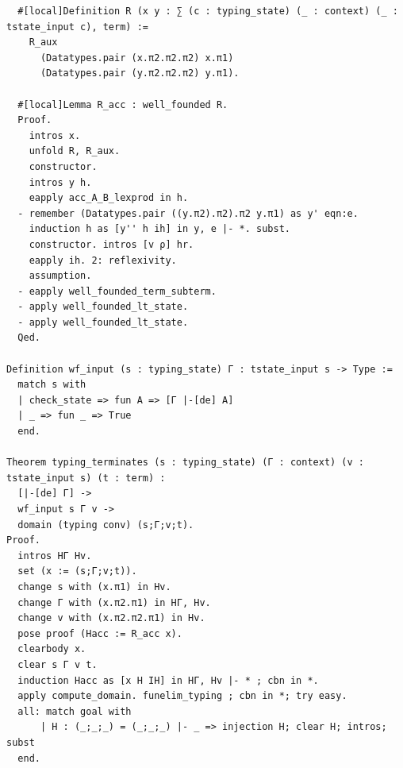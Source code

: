 \begin{lstlisting}
  #[local]Definition R (x y : ∑ (c : typing_state) (_ : context) (_ : tstate_input c), term) :=
    R_aux
      (Datatypes.pair (x.π2.π2.π2) x.π1)
      (Datatypes.pair (y.π2.π2.π2) y.π1).
  
  #[local]Lemma R_acc : well_founded R.
  Proof.
    intros x.
    unfold R, R_aux.
    constructor.
    intros y h.
    eapply acc_A_B_lexprod in h.
  - remember (Datatypes.pair ((y.π2).π2).π2 y.π1) as y' eqn:e.
    induction h as [y'' h ih] in y, e |- *. subst.
    constructor. intros [v ρ] hr.
    eapply ih. 2: reflexivity.
    assumption.
  - eapply well_founded_term_subterm.
  - apply well_founded_lt_state.
  - apply well_founded_lt_state. 
  Qed.

Definition wf_input (s : typing_state) Γ : tstate_input s -> Type :=
  match s with
  | check_state => fun A => [Γ |-[de] A]
  | _ => fun _ => True
  end.

Theorem typing_terminates (s : typing_state) (Γ : context) (v : tstate_input s) (t : term) :
  [|-[de] Γ] ->
  wf_input s Γ v ->
  domain (typing conv) (s;Γ;v;t).
Proof.
  intros HΓ Hv.
  set (x := (s;Γ;v;t)).
  change s with (x.π1) in Hv.
  change Γ with (x.π2.π1) in HΓ, Hv.
  change v with (x.π2.π2.π1) in Hv.
  pose proof (Hacc := R_acc x).
  clearbody x.
  clear s Γ v t.
  induction Hacc as [x H IH] in HΓ, Hv |- * ; cbn in *.
  apply compute_domain. funelim_typing ; cbn in *; try easy.
  all: match goal with 
      | H : (_;_;_) = (_;_;_) |- _ => injection H; clear H; intros; subst
  end.


\end{lstlisting}

